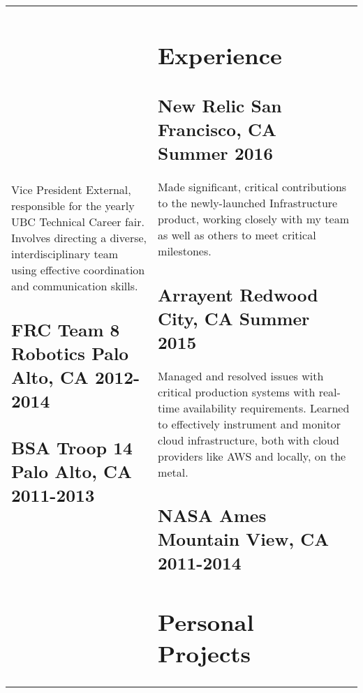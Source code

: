 \documentclass[letterpaper]{article}
\newlength{\leftcol}
\newlength{\rightcol}
\newcommand{\subtitle}{\normalfont\sffamily\color{black}\large}
\begin{document}
\begin{tabularx}{\textwidth}{@{}p{\leftcol} p{\rightcol}}
Vice President External, responsible for the yearly UBC Technical Career fair.
Involves directing a diverse, interdisciplinary team using effective
coordination and communication skills.

\subsection*{FRC Team 8 Robotics \newline\subtitle Palo Alto, CA 2012-2014}

\subsection*{BSA Troop 14 \newline\subtitle Palo Alto, CA 2011-2013}

&

\vspace*{2pt}

\section*{Experience}


\subsection*{New Relic \subtitle San Francisco, CA Summer 2016}

Made significant, critical contributions to the newly-launched Infrastructure
product, working closely with my team as well as others to meet critical milestones.

\subsection*{Arrayent \subtitle Redwood City, CA Summer 2015}

Managed and resolved issues with critical production systems with real-time
availability requirements. Learned to effectively instrument and monitor cloud
infrastructure, both with cloud providers like AWS and locally, on the metal.

\subsection*{NASA Ames \subtitle Mountain View, CA 2011-2014}

\section*{Personal Projects}


\end{tabularx}
\end{document}

